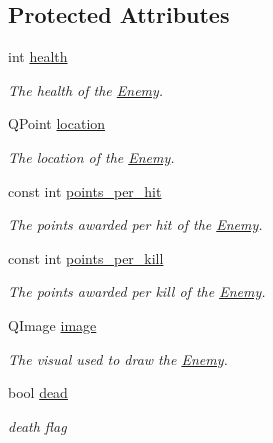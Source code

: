 \subsection*{Protected Attributes}
\begin{DoxyCompactItemize}
\item 
\hypertarget{classEnemy_aedd5e7bf8ef07ee97be433c853a10d8d}{
int \hyperlink{classEnemy_aedd5e7bf8ef07ee97be433c853a10d8d}{health}}
\label{classEnemy_aedd5e7bf8ef07ee97be433c853a10d8d}

\begin{DoxyCompactList}\small\item\em The health of the \hyperlink{classEnemy}{Enemy}. \end{DoxyCompactList}\item 
\hypertarget{classEnemy_a963f6a898c2ecfd53cc6abb283f40123}{
QPoint \hyperlink{classEnemy_a963f6a898c2ecfd53cc6abb283f40123}{location}}
\label{classEnemy_a963f6a898c2ecfd53cc6abb283f40123}

\begin{DoxyCompactList}\small\item\em The location of the \hyperlink{classEnemy}{Enemy}. \end{DoxyCompactList}\item 
\hypertarget{classEnemy_a04d876545226672f5e3409359d2210be}{
const int \hyperlink{classEnemy_a04d876545226672f5e3409359d2210be}{points\_\-per\_\-hit}}
\label{classEnemy_a04d876545226672f5e3409359d2210be}

\begin{DoxyCompactList}\small\item\em The points awarded per hit of the \hyperlink{classEnemy}{Enemy}. \end{DoxyCompactList}\item 
\hypertarget{classEnemy_a217aa59401d8bfc8a20df630238fd3c5}{
const int \hyperlink{classEnemy_a217aa59401d8bfc8a20df630238fd3c5}{points\_\-per\_\-kill}}
\label{classEnemy_a217aa59401d8bfc8a20df630238fd3c5}

\begin{DoxyCompactList}\small\item\em The points awarded per kill of the \hyperlink{classEnemy}{Enemy}. \end{DoxyCompactList}\item 
\hypertarget{classEnemy_a2998d1a603172afaffb8011516286eff}{
QImage \hyperlink{classEnemy_a2998d1a603172afaffb8011516286eff}{image}}
\label{classEnemy_a2998d1a603172afaffb8011516286eff}

\begin{DoxyCompactList}\small\item\em The visual used to draw the \hyperlink{classEnemy}{Enemy}. \end{DoxyCompactList}\item 
bool \hyperlink{classEnemy_a4b1b61e7bc79aca01f3e4b3ef19cb787}{dead}
\begin{DoxyCompactList}\small\item\em death flag \end{DoxyCompactList}\end{DoxyCompactItemize}


